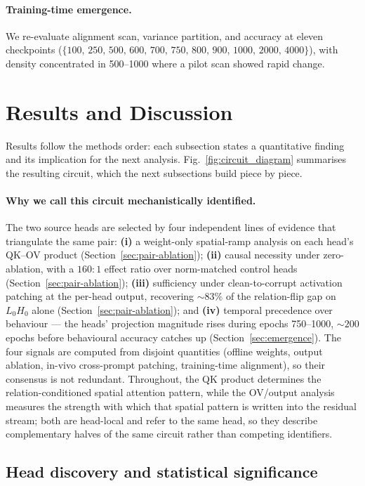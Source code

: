 \documentclass{article}
\theoremstyle{plain}
\theoremstyle{definition}
\begin{document}
\paragraph{Training-time emergence.}
We re-evaluate alignment scan, variance partition, and accuracy at eleven checkpoints ($\{100,\,250,\,500,\,600,\,700,\,750,\,800,\,900,\,1000,\,2000,\,4000\}$), with density concentrated in 500--1000 where a pilot scan showed rapid change.

\section{Results and Discussion}

Results follow the methods order: each subsection states a quantitative finding and its implication for the next analysis. Fig.~\ref{fig:circuit_diagram} summarises the resulting circuit, which the next subsections build piece by piece.

\paragraph{Why we call this circuit mechanistically identified.} The two source heads are selected by four independent lines of evidence that triangulate the same pair: \textbf{(i)} a weight-only spatial-ramp analysis on each head's QK--OV product (Section~\ref{sec:pair-ablation}); \textbf{(ii)} causal necessity under zero-ablation, with a $160{:}1$ effect ratio over norm-matched control heads (Section~\ref{sec:pair-ablation}); \textbf{(iii)} sufficiency under clean-to-corrupt activation patching at the per-head output, recovering $\sim\!83\%$ of the relation-flip gap on $L_0H_0$ alone (Section~\ref{sec:pair-ablation}); and \textbf{(iv)} temporal precedence over behaviour --- the heads' projection magnitude rises during epochs 750--1000, $\sim\!200$ epochs before behavioural accuracy catches up (Section~\ref{sec:emergence}). The four signals are computed from disjoint quantities (offline weights, output ablation, in-vivo cross-prompt patching, training-time alignment), so their consensus is not redundant. Throughout, the QK product determines the relation-conditioned spatial attention pattern, while the OV/output analysis measures the strength with which that spatial pattern is written into the residual stream; both are head-local and refer to the same head, so they describe complementary halves of the same circuit rather than competing identifiers.

\subsection{Head discovery and statistical significance}
\end{document}
